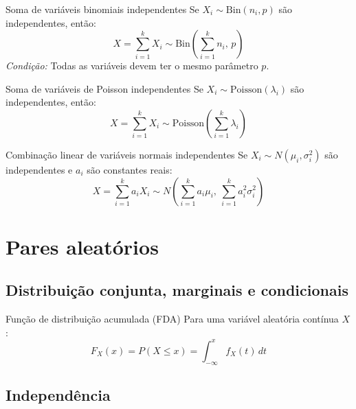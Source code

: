 \documentclass[a4paper,12pt]{article}
\begin{document}
\begin{formulabox}{Soma de variáveis binomiais independentes}
Se $X_i \sim \mathrm{Bin}(n_i, p)$ são independentes, então:
\begin{equation}\label{formula14}\tag{Fórmula 14}
    X = \sum_{i=1}^k X_i \sim \mathrm{Bin}\left(\sum_{i=1}^k n_i,\, p\right)
\end{equation}
\textit{Condição:} Todas as variáveis devem ter o mesmo parâmetro $p$.
\end{formulabox}

\begin{formulabox}{Soma de variáveis de Poisson independentes}
Se $X_i \sim \mathrm{Poisson}(\lambda_i)$ são independentes, então:
\begin{equation}\label{formula15}\tag{Fórmula 15}
    X = \sum_{i=1}^k X_i \sim \mathrm{Poisson}\left(\sum_{i=1}^k \lambda_i\right)
\end{equation}
\end{formulabox}

\begin{formulabox}{Combinação linear de variáveis normais independentes}
Se $X_i \sim N(\mu_i, \sigma_i^2)$ são independentes e $a_i$ são constantes reais:
\begin{equation}\label{formula16}\tag{Fórmula 16}
    X = \sum_{i=1}^k a_i X_i \sim N\left(\sum_{i=1}^k a_i \mu_i,\ \sum_{i=1}^k a_i^2 \sigma_i^2\right)
\end{equation}
\end{formulabox}

\newpage

\section{\color{sectioncolor}Pares aleatórios}
\subsection{Distribuição conjunta, marginais e condicionais}

\begin{formulabox}{Função de distribuição acumulada (FDA)}
Para uma variável aleatória contínua $X$:
\begin{equation}\label{formula17}\tag{Fórmula 17}
    F_X(x) = P(X \leq x) = \int_{-\infty}^{x} f_X(t)\,dt
\end{equation}
\end{formulabox}

\subsection{Independência}
\end{document}
